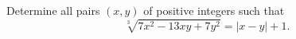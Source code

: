 Determine all pairs 
$(x, y)$
 of positive integers such that 
\[\sqrt[3]{7x^2-13xy+7y^2}=|x-y|+1.\]
